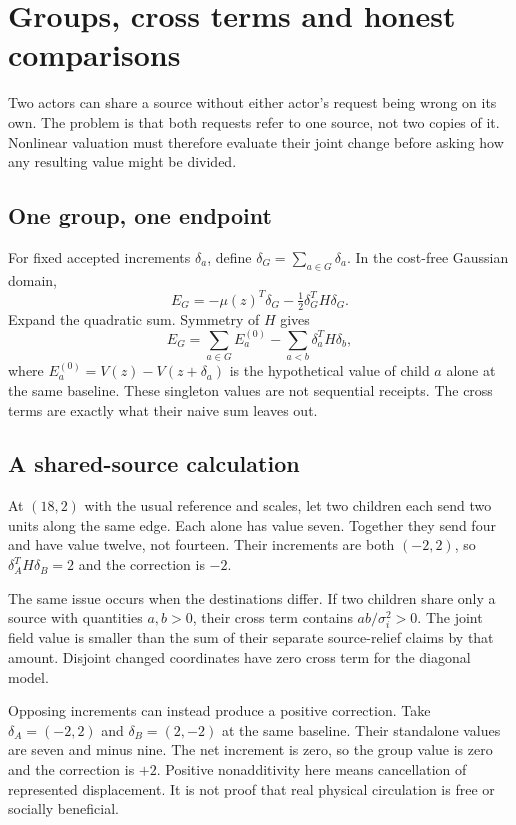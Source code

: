 \chapter{Groups, cross terms and honest comparisons}\label{ch:groups}
Two actors can share a source without either actor's request being wrong on
its own. The problem is that both requests refer to one source, not two
copies of it. Nonlinear valuation must therefore evaluate their joint change
before asking how any resulting value might be divided.

\section{One group, one endpoint}
For fixed accepted increments $\delta_a$, define
$\delta_G=\sum_{a\in G}\delta_a$. In the cost-free Gaussian domain,
\begin{equation}
 E_G=-\mu(z)^T\delta_G-\tfrac12\delta_G^TH\delta_G.
\end{equation}
Expand the quadratic sum. Symmetry of $H$ gives
\begin{equation}\label{eq:cross}
 E_G=\sum_{a\in G}E_a^{(0)}
       -\sum_{a<b}\delta_a^TH\delta_b,
\end{equation}
where $E_a^{(0)}=V(z)-V(z+\delta_a)$ is the hypothetical value of child
$a$ alone at the same baseline. These singleton values are not sequential
receipts. The cross terms are exactly what their naive sum leaves out.

\section{A shared-source calculation}
At $(18,2)$ with the usual reference and scales, let two children each send
two units along the same edge. Each alone has value seven. Together they
send four and have value twelve, not fourteen. Their increments are both
$(-2,2)$, so $\delta_A^TH\delta_B=2$ and the correction is $-2$.

The same issue occurs when the destinations differ. If two children share
only a source with quantities $a,b>0$, their cross term contains
$ab/\sigma_i^2>0$. The joint field value is smaller than the sum of
their separate source-relief claims by that amount. Disjoint changed
coordinates have zero cross term for the diagonal model.

Opposing increments can instead produce a positive correction. Take
$\delta_A=(-2,2)$ and $\delta_B=(2,-2)$ at the same baseline. Their
standalone values are seven and minus nine. The net increment is zero,
so the group value is zero and the correction is $+2$. Positive
nonadditivity here means cancellation of represented displacement. It is
not proof that real physical circulation is free or socially beneficial.

